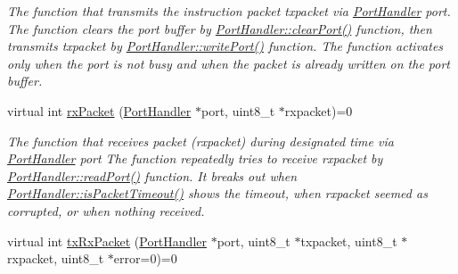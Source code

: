 \begin{DoxyCompactItemize}
\begin{DoxyCompactList}\small\item\em The function that transmits the instruction packet txpacket via \hyperlink{classmercury_1_1_port_handler}{Port\+Handler} port.  The function clears the port buffer by \hyperlink{classmercury_1_1_port_handler_accf37c8838c1ce3042a0127ceeb89c48}{Port\+Handler\+::clear\+Port()} function,  then transmits txpacket by \hyperlink{classmercury_1_1_port_handler_ad26c3a106d6b668b6fae3d2f0afeab9e}{Port\+Handler\+::write\+Port()} function.  The function activates only when the port is not busy and when the packet is already written on the port buffer. \end{DoxyCompactList}\item 
virtual int \hyperlink{classmercury_1_1_packet_handler_a01a3929c3514eac14b4ca5a61b498e20}{rx\+Packet} (\hyperlink{classmercury_1_1_port_handler}{Port\+Handler} $\ast$port, uint8\+\_\+t $\ast$rxpacket)=0
\begin{DoxyCompactList}\small\item\em The function that receives packet (rxpacket) during designated time via \hyperlink{classmercury_1_1_port_handler}{Port\+Handler} port  The function repeatedly tries to receive rxpacket by \hyperlink{classmercury_1_1_port_handler_afa6f52d7b95c5ffd8f0c92477d517c79}{Port\+Handler\+::read\+Port()} function.  It breaks out  when \hyperlink{classmercury_1_1_port_handler_a6733438255ede3d34738842e10cd8fc2}{Port\+Handler\+::is\+Packet\+Timeout()} shows the timeout,  when rxpacket seemed as corrupted, or  when nothing received. \end{DoxyCompactList}\item 
virtual int \hyperlink{classmercury_1_1_packet_handler_ac7ceeaec210827d119199144badaad3a}{tx\+Rx\+Packet} (\hyperlink{classmercury_1_1_port_handler}{Port\+Handler} $\ast$port, uint8\+\_\+t $\ast$txpacket, uint8\+\_\+t $\ast$rxpacket, uint8\+\_\+t $\ast$error=0)=0

\end{DoxyCompactItemize}

